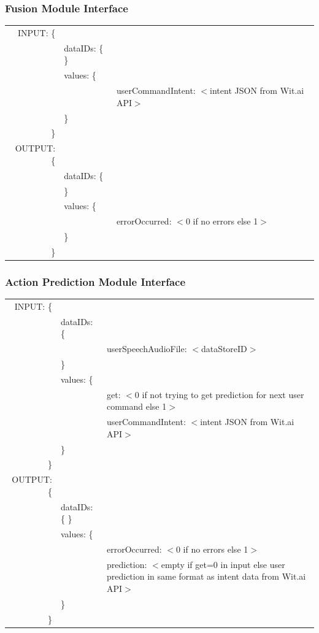 \documentclass[onecolumn, draftclsnofoot,10pt, compsoc]{IEEEtran}
\begin{document}
        \subsubsection{Fusion Module Interface}
            \begin{tabular}[t]{r l p{4.5in}}
                INPUT: \{ & & \\
                & dataIDs: \{ \} & \\
                & values: \{ & \\
                & & userCommandIntent: $<$intent JSON from Wit.ai API$>$ \\
                & \} & \\
                \} & & \\
                OUTPUT: \{ & & \\
                & dataIDs: \{ & \\
                & \} & \\
                & values: \{ & \\
                & & errorOccurred: $<$0 if no errors else 1$>$ \\
                & \} & \\
                \} & & \\
            \end{tabular}

        \subsubsection{Action Prediction Module Interface}
            \begin{tabular}[t]{r l p{4.5in}}
                INPUT: \{ & & \\
                & dataIDs: \{ & \\
                & & userSpeechAudioFile: $<$dataStoreID$>$ \\
                & \} & \\
                & values: \{ & \\
                & & get: $<$0 if not trying to get prediction for next user command else 1$>$ \\
                & & userCommandIntent: $<$intent JSON from Wit.ai API$>$ \\
                & \} & \\
                \} & & \\
                OUTPUT: \{ & & \\
                & dataIDs: \{ \} & \\
                & values: \{ & \\
                & & errorOccurred: $<$0 if no errors else 1$>$ \\
                & & prediction: $<$empty if get=0 in input else user prediction in same format as intent data from Wit.ai API$>$ \\
                & \} & \\
                \} & & \\
            \end{tabular}
\end{document}
